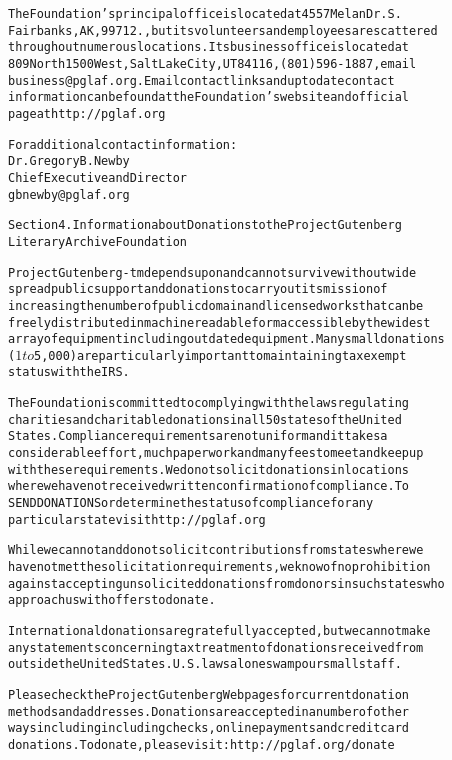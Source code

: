 \documentclass[12pt]{book}[2005/09/16]
\newenvironment{PGtext}{%
\begin{alltt}
\fontsize{8.1}{9}\ttfamily\selectfont}%
{\end{alltt}}
\begin{document}
\begin{PGtext}
The Foundation's principal office is located at 4557 Melan Dr. S.
Fairbanks, AK, 99712., but its volunteers and employees are scattered
throughout numerous locations.  Its business office is located at
809 North 1500 West, Salt Lake City, UT 84116, (801) 596-1887, email
business@pglaf.org.  Email contact links and up to date contact
information can be found at the Foundation's web site and official
page at http://pglaf.org

For additional contact information:
     Dr. Gregory B. Newby
     Chief Executive and Director
     gbnewby@pglaf.org


Section 4.  Information about Donations to the Project Gutenberg
Literary Archive Foundation

Project Gutenberg-tm depends upon and cannot survive without wide
spread public support and donations to carry out its mission of
increasing the number of public domain and licensed works that can be
freely distributed in machine readable form accessible by the widest
array of equipment including outdated equipment.  Many small donations
($1 to $5,000) are particularly important to maintaining tax exempt
status with the IRS.

The Foundation is committed to complying with the laws regulating
charities and charitable donations in all 50 states of the United
States.  Compliance requirements are not uniform and it takes a
considerable effort, much paperwork and many fees to meet and keep up
with these requirements.  We do not solicit donations in locations
where we have not received written confirmation of compliance.  To
SEND DONATIONS or determine the status of compliance for any
particular state visit http://pglaf.org

While we cannot and do not solicit contributions from states where we
have not met the solicitation requirements, we know of no prohibition
against accepting unsolicited donations from donors in such states who
approach us with offers to donate.

International donations are gratefully accepted, but we cannot make
any statements concerning tax treatment of donations received from
outside the United States.  U.S. laws alone swamp our small staff.

Please check the Project Gutenberg Web pages for current donation
methods and addresses.  Donations are accepted in a number of other
ways including including checks, online payments and credit card
donations.  To donate, please visit: http://pglaf.org/donate



\end{PGtext}
\end{document}
